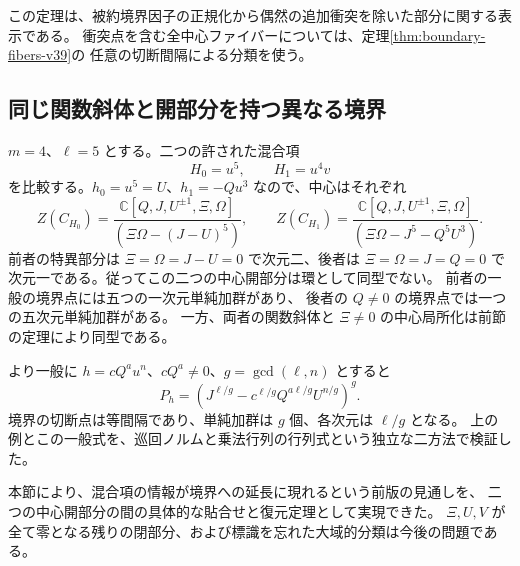 この定理は、被約境界因子の正規化から偶然の追加衝突を除いた部分に関する表示である。
衝突点を含む全中心ファイバーについては、定理\ref{thm:boundary-fibers-v39}の
任意の切断間隔による分類を使う。

\subsection{同じ関数斜体と開部分を持つ異なる境界}

$m=4$、$\ell=5$ とする。二つの許された混合項
\[
 H_0=u^5,\qquad H_1=u^4v
\]
を比較する。$h_0=u^5=U$、$h_1=-Qu^3$ なので、中心はそれぞれ
\begin{equation}\label{eq:boundary-order5-example-v39}
 Z(C_{H_0})=\frac{\mathbb C[Q,J,U^{\pm1},\Xi,\Omega]}
 {(\Xi\Omega-(J-U)^5)},\qquad
 Z(C_{H_1})=\frac{\mathbb C[Q,J,U^{\pm1},\Xi,\Omega]}
 {(\Xi\Omega-J^5-Q^5U^3)}.
\end{equation}
前者の特異部分は $\Xi=\Omega=J-U=0$ で次元二、後者は
$\Xi=\Omega=J=Q=0$ で次元一である。従ってこの二つの中心開部分は環として同型でない。
前者の一般の境界点には五つの一次元単純加群があり、
後者の $Q\ne0$ の境界点では一つの五次元単純加群がある。
一方、両者の関数斜体と $\Xi\ne0$ の中心局所化は前節の定理により同型である。

より一般に $h=cQ^a u^n$、$cQ^a\ne0$、$g=\gcd(\ell,n)$ とすると
\[
 P_h=\left(J^{\ell/g}-c^{\ell/g}Q^{a\ell/g}U^{n/g}\right)^g.
\]
境界の切断点は等間隔であり、単純加群は $g$ 個、各次元は $\ell/g$ となる。
上の例とこの一般式を、巡回ノルムと乗法行列の行列式という独立な二方法で検証した。

本節により、混合項の情報が境界への延長に現れるという前版の見通しを、
二つの中心開部分の間の具体的な貼合せと復元定理として実現できた。
$\Xi,U,V$ が全て零となる残りの閉部分、および標識を忘れた大域的分類は今後の問題である。
